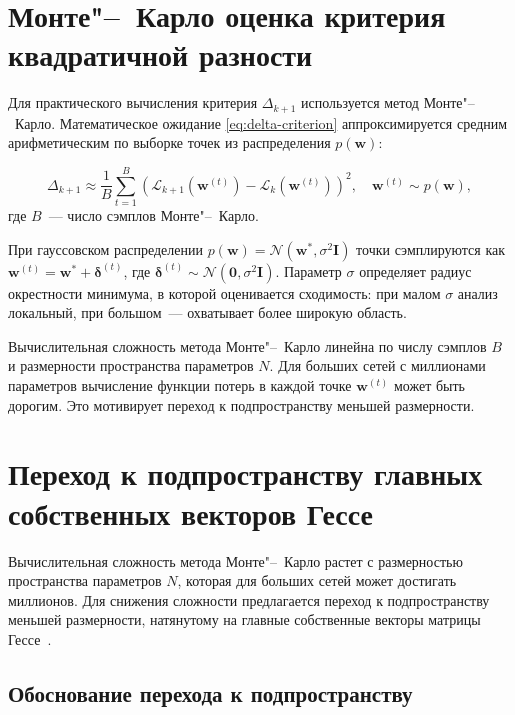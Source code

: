 \section{Монте"--~Карло оценка критерия квадратичной разности}

Для практического вычисления критерия $\Delta_{k+1}$ используется метод Монте"--~Карло. Математическое ожидание \eqref{eq:delta-criterion} аппроксимируется средним арифметическим по выборке точек из распределения $p(\mathbf{w})$:

\begin{equation}
\label{eq:mc-estimate}
\Delta_{k+1} \approx \frac{1}{B}\sum_{t=1}^B \left(\mathcal{L}_{k+1}(\mathbf{w}^{(t)}) - \mathcal{L}_k(\mathbf{w}^{(t)})\right)^2, \quad \mathbf{w}^{(t)} \sim p(\mathbf{w}),
\end{equation}
где $B$~--- число сэмплов Монте"--~Карло.

При гауссовском распределении $p(\mathbf{w}) = \mathcal{N}(\mathbf{w}^*, \sigma^2 \mathbf{I})$ точки сэмплируются как $\mathbf{w}^{(t)} = \mathbf{w}^* + \boldsymbol{\delta}^{(t)}$, где $\boldsymbol{\delta}^{(t)} \sim \mathcal{N}(\mathbf{0}, \sigma^2 \mathbf{I})$. Параметр $\sigma$ определяет радиус окрестности минимума, в которой оценивается сходимость: при малом $\sigma$ анализ локальный, при большом~--- охватывает более широкую область.

Вычислительная сложность метода Монте"--~Карло линейна по числу сэмплов $B$ и размерности пространства параметров $N$. Для больших сетей с миллионами параметров вычисление функции потерь в каждой точке $\mathbf{w}^{(t)}$ может быть дорогим. Это мотивирует переход к подпространству меньшей размерности.

\section{Переход к подпространству главных собственных векторов Гессе}

Вычислительная сложность метода Монте"--~Карло растет с размерностью пространства параметров $N$, которая для больших сетей может достигать миллионов. Для снижения сложности предлагается переход к подпространству меньшей размерности, натянутому на главные собственные векторы матрицы Гессе~\cite{papyan2019spectrum}.

\subsection{Обоснование перехода к подпространству}

